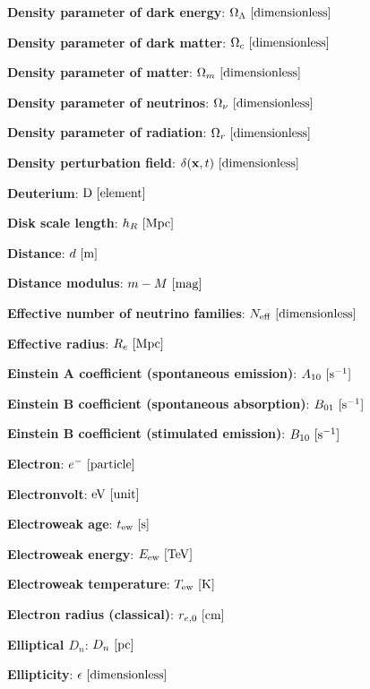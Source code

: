 \documentclass[a4paper,11pt]{article}
\begin{document}
{\noindent}\textbf{Density parameter of dark energy}: $\Omega_\Lambda ~ [{\rm dimensionless}]$

{\noindent}\textbf{Density parameter of dark matter}: $\Omega_c ~ [{\rm dimensionless}]$

{\noindent}\textbf{Density parameter of matter}: $\Omega_m ~ [{\rm dimensionless}]$

{\noindent}\textbf{Density parameter of neutrinos}: $\Omega_\nu ~ [{\rm dimensionless}]$

{\noindent}\textbf{Density parameter of radiation}: $\Omega_r ~ [{\rm dimensionless}]$

{\noindent}\textbf{Density perturbation field}: $\delta(\mathbf{x},t) ~ [{\rm dimensionless}]$

{\noindent}\textbf{Deuterium}: ${\rm D} ~ [{\rm element}]$

{\noindent}\textbf{Disk scale length}: $h_R ~ [{\rm Mpc}]$

{\noindent}\textbf{Distance}: $d ~ [{\rm m}]$

{\noindent}\textbf{Distance modulus}: $m - M ~ [{\rm mag}]$

{\noindent}\textbf{Effective number of neutrino families}: $N_\mathrm{eff} ~ [{\rm dimensionless}]$

{\noindent}\textbf{Effective radius}: $R_e ~ [{\rm Mpc}]$

{\noindent}\textbf{Einstein A coefficient (spontaneous emission)}: $A_{10} ~ [{\rm s^{-1}}]$

{\noindent}\textbf{Einstein B coefficient (spontaneous absorption)}: $B_{01} ~ [{\rm s^{-1}}]$

{\noindent}\textbf{Einstein B coefficient (stimulated emission)}: $B_{10} ~ [{\rm s^{-1}}]$

{\noindent}\textbf{Electron}: $e^- ~ [{\rm particle}]$

{\noindent}\textbf{Electronvolt}: ${\rm eV} ~ [{\rm unit}]$

{\noindent}\textbf{Electroweak age}: $t_\mathrm{ew} ~ [{\rm s}]$

{\noindent}\textbf{Electroweak energy}: $E_\mathrm{ew} ~ [{\rm TeV}]$

{\noindent}\textbf{Electroweak temperature}: $T_\mathrm{ew} ~ [{\rm K}]$

{\noindent}\textbf{Electron radius (classical)}: $r_{e,0} ~ [{\rm cm}]$

{\noindent}\textbf{Elliptical $D_n$}: $D_n ~ [{\rm pc}]$

{\noindent}\textbf{Ellipticity}: $\epsilon ~ [{\rm dimensionless}]$
\end{document}
